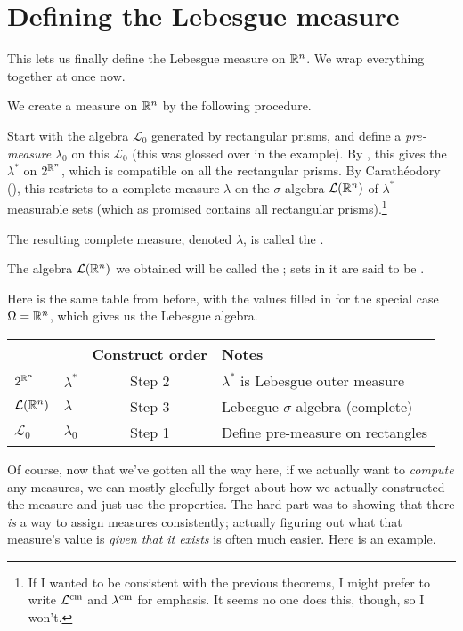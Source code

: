 \section{Defining the Lebesgue measure}
\label{sec:define_lebesgue_measure}
This lets us finally define the Lebesgue measure on $\mathbb R^n$.
We wrap everything together at once now.
\begin{definition}
	We create a measure on $\mathbb R^n$ by the following procedure.
	\begin{itemize}
		\ii Start with the algebra $\mathcal{L}_0$
		generated by rectangular prisms,
		and define a \emph{pre-measure} $\lambda_0$ on this $\mathcal{L}_0$
		(this was glossed over in the example).
		\ii By ,
		this gives the 
		$\lambda^\ast$ on $2^{\mathbb R^n}$,
		which is compatible on all the rectangular prisms.
		\ii By Carath\'{e}odory (),
		this restricts to a complete measure $\lambda$
		on the $\sigma$-algebra $\mathcal{L}(\mathbb R^n)$
		of $\lambda^\ast$-measurable sets
		(which as promised contains all rectangular prisms).\footnote{If
			I wanted to be consistent with the previous theorems,
			I might prefer to write $\mathcal{L}^\text{cm}$
			and $\lambda^\text{cm}$ for emphasis.
			It seems no one does this, though, so I won't.}
	\end{itemize}
	The resulting complete measure, denoted $\lambda$,
	is called the .

	The algebra $\mathcal{L}(\mathbb R^n)$ we obtained will be called the
	;
	sets in it are said to be .
\end{definition}

Here is the same table from before,
with the values filled in for the special case $\Omega = \mathbb R^n$,
which gives us the Lebesgue algebra.
\begin{center}
	\begin{tabular}[h]{llcl}
		& & Construct order & Notes \\ \hline
		$2^{\mathbb R^n}$ & $\lambda^\ast$ & Step 2 &
			$\lambda^\ast$ is Lebesgue outer measure \\[1em]
		$\mathcal L(\mathbb R^n)$ & $\lambda$ & Step 3 & Lebesgue $\sigma$-algebra (complete) \\[1em]
		$\mathcal L_0$ & $\lambda_0$ & Step 1 & Define pre-measure on rectangles
	\end{tabular}
\end{center}


Of course, now that we've gotten all the way here,
if we actually want to \emph{compute} any measures,
we can mostly gleefully forget about how we actually constructed
the measure and just use the properties.
The hard part was to showing that there \emph{is}
a way to assign measures consistently;
actually figuring out what that measure's value is
\emph{given that it exists} is often much easier.
Here is an example.

